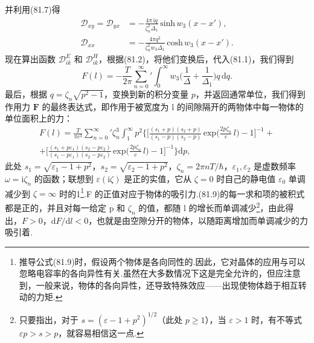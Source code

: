 并利用(81.7)得
\begin{equation*}
  \begin{aligned}
    \mathcal{D}_{xy}=\mathcal{D}_{yx}&=-\frac{4\pi\,\mathrm{i}q}{\zeta_n^{2}\Delta_1}\,\mathrm{sinh}\,w_3(x-x'),\\
    \mathcal{D}_{xx}&=-\frac{4\pi q^{2}}{\zeta_n^{2}w_3\Delta_1}\,\mathrm{cosh}\,w_3(x-x').
  \end{aligned}
\end{equation*}
现在算出函数 $\mathcal{D}^{E}_{ik}$ 和 $\mathcal{D}^{H}_{ik}$，根据(81.2)，将他们变换后，代入(81.1)，我们得到
\begin{equation*}
  F(l)=-\frac{T}{2\pi}\sum_{n=0}^{\infty}{}'\int_{0}^{\infty}w_3\biggl(\frac{1}{\Delta}+\frac{1}{\Delta_1}\biggr)q\,\mathrm{d}q.
\end{equation*}
最后，根据 $q=\zeta_n\sqrt{p^{2}-1}$，变换到新的积分变量 $p$，并返回通常单位，我们得到作用力 $\bm{F}$ 的最终表达式，即作用于被宽度为 l 的间隙隔开的两物体中每一物体的单位面积上的力：
\begin{equation}
  \begin{aligned}
    F(l)=\frac{T}{\pi c^{3}}\sum_{n=0}^{\infty}{}'\zeta_n^{3}\int_{1}^{\infty}p^{2}\biggl\{\biggl[\frac{(s_1+p)(s_2+p)}{(s_1-p)(s_2-p)}\,\mathrm{exp}\biggl(\frac{2p\zeta_n}{c}\,l\biggr)-1\biggr]^{-1}+\\
    +\biggl[\frac{(s_1+p\varepsilon_1)(s_2-p\varepsilon_2)}{(s_1-p\varepsilon_1)(s_2-p\varepsilon_2)}\,\mathrm{exp}\biggl(\frac{2p\zeta_n}{c}\,l\biggr)-1\biggr]^{-1}\biggr\}\mathrm{d}p,
  \end{aligned}
\end{equation}
此处 $s_1=\sqrt{\varepsilon_1-1+p^{2}}$，$s_2=\sqrt{\varepsilon_2-1+p^{2}}$，$\zeta_n=2\pi nT/\hbar$，$\varepsilon_1,\varepsilon_2$ 是虚数频率 $\omega=\mathrm{i}\zeta_n$ 的函数；联想到 $\varepsilon(\mathrm{i}\zeta)$ 是正的实值，它从 $\zeta=0$ 时自己的静电值 $\varepsilon_0$ 单调减少到 $\zeta=\infty$ 时的1\footnote{推导公式(81.9)时，假设两个物体是各向同性的.因此，它对晶体的应用与可以忽略电容率的各向异性有关.虽然在大多数情况下这是完全允许的，但应注意到，一般来说，物体的各向异性，还导致特殊效应——出现使物体趋于相互转动的力矩.}.F 的正值对应于物体的吸引力.(81.9)的每一求和项的被积式都是正的，并且对每一给定 p 和 $\zeta_n$ 的值，都随 l 的增长而单调减少\footnote{只要指出，对于 $s=(\varepsilon-1+p^{2})^{1/2}$（此处 $p\geqslant 1$），当 $\varepsilon>1$ 时，有不等式 $\varepsilon p>s>p$，就容易相信这一点.}，由此得出，$F>0$，$\mathrm{d}F/\mathrm{d}l<0$，也就是由空隙分开的物体，以随距离增加而单调减少的力吸引着.

